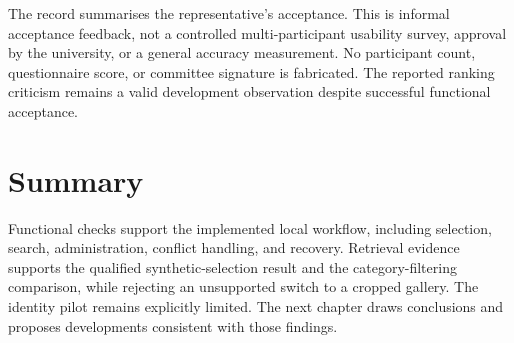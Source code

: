 The record  summarises the
representative's acceptance. This is informal acceptance feedback, not a
controlled multi-participant usability survey, approval by the university,
or a general accuracy measurement. No participant count, questionnaire score,
or committee signature is fabricated. The reported ranking criticism remains
a valid development observation despite successful functional acceptance.

\section{Summary}
Functional checks support the implemented local workflow, including selection,
search, administration, conflict handling, and recovery. Retrieval evidence
supports the qualified synthetic-selection result and the category-filtering
comparison, while rejecting an unsupported switch to a cropped gallery.
The identity pilot remains explicitly limited. The next chapter draws conclusions
and proposes developments consistent with those findings.
